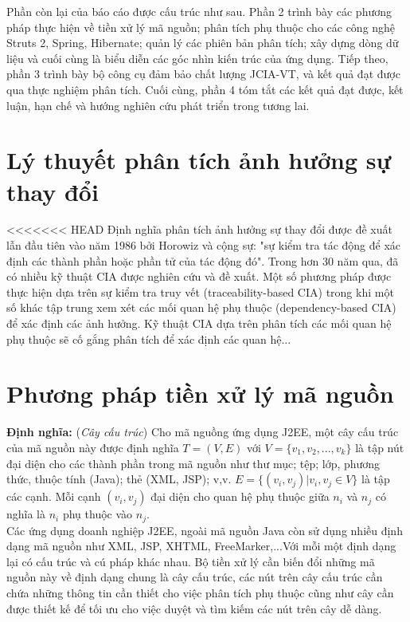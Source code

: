 \documentclass[12pt]{report}
\begin{document}
Phần còn lại của báo cáo được cấu trúc như sau. Phần 2 trình bày các phương pháp
thực hiện về tiền xử lý mã nguồn; phân tích phụ thuộc cho các công nghệ Struts 2, Spring,
Hibernate; quản lý các phiên bản phân tích; xây dựng dòng dữ liệu và cuối cùng là biểu
diễn các góc nhìn kiến trúc của ứng dụng. Tiếp theo, phần 3 trình bày bộ công cụ đảm
bảo chất lượng JCIA-VT, và kết quả đạt được qua thực nghiệm phân tích. Cuối cùng,
phần 4 tóm tắt các kết quả đạt được, kết luận, hạn chế và hướng nghiên cứu phát triển
trong tương lai.


\newpage	
\chapter{Lý thuyết phân tích ảnh hưởng sự thay đổi}
<<<<<<< HEAD
Định nghĩa phân tích ảnh hưởng sự thay đổi được đề xuất lẫn đầu tiên vào năm 1986 bởi Horowiz và cộng sự: "sự kiểm tra tác động để xác định các thành phần hoặc phần tử của tác động đó". Trong hơn 30 năm qua, đã có nhiều kỹ thuật CIA được nghiên cứu và đề xuất. Một số phương pháp được thực hiện dựa trên sự kiểm tra truy vết (traceability-based CIA) trong khi một số khác tập trung xem xét các mối quan hệ phụ thuộc (dependency-based CIA) để xác định các ảnh hưởng. Kỹ thuật CIA dựa trên phân tích các mối quan hệ phụ thuộc sẽ cố gắng phân tích để xác định các quan hệ...

\newpage
\chapter{Phương pháp tiền xử lý mã nguồn}
\textbf{Định nghĩa:} (\textit{Cây cấu trúc}) Cho mã nguồng ứng dụng J2EE, một cây cấu trúc của mã nguồn này được định nghĩa $T = (V, E)$ với $V = \{v_1, v_2,..., v_k\}$ là tập nút đại diện cho các thành phần trong mã nguồn như thư mục; tệp; lớp, phương thức, thuộc tính (Java); thẻ (XML, JSP); v,v. $E = \{(v_i, v_j) | v_i,v_j \in V\}$ là tập các cạnh. Mỗi cạnh $(v_i,v_j)$ đại diện cho quan hệ phụ thuộc giữa $n_i$ và $n_j$ có nghĩa là $n_i$ phụ thuộc vào $n_j$.\\

Các ứng dụng doanh nghiệp J2EE, ngoài mã nguồn Java còn sử dụng nhiều định
dạng mã nguồn như XML, JSP, XHTML, FreeMarker,...Với mỗi một định dạng lại có
cấu trúc và cú pháp khác nhau. Bộ tiền xử lý cần biến đổi những mã nguồn này về định
dạng chung là cây cấu trúc, các nút trên cây cấu trúc cần chứa những thông tin cần thiết
cho việc phân tích phụ thuộc cũng như cây cần được thiết kế để tối ưu cho việc duyệt và
tìm kiếm các nút trên cây dễ dàng.
\end{document}
